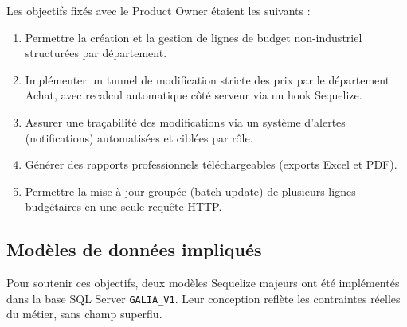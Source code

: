 Les objectifs fixés avec le Product Owner étaient les suivants :
\begin{enumerate}
    \item Permettre la création et la gestion de lignes de budget non-industriel structurées par département.
    \item Implémenter un tunnel de modification stricte des prix par le département Achat, avec recalcul automatique côté serveur via un hook Sequelize.
    \item Assurer une traçabilité des modifications via un système d'alertes (notifications) automatisées et ciblées par rôle.
    \item Générer des rapports professionnels téléchargeables (exports Excel et PDF).
    \item Permettre la mise à jour groupée (batch update) de plusieurs lignes budgétaires en une seule requête HTTP.
\end{enumerate}

\subsection{Modèles de données impliqués}
Pour soutenir ces objectifs, deux modèles Sequelize majeurs ont été implémentés dans la base SQL Server \texttt{GALIA\_V1}. Leur conception reflète les contraintes réelles du métier, sans champ superflu.

